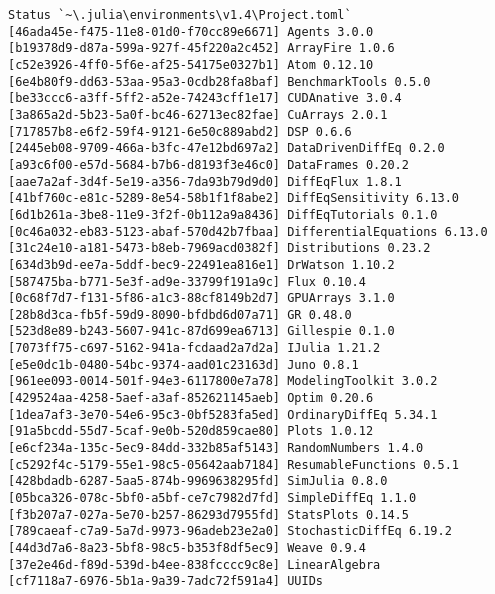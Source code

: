 \documentclass[12pt,a4paper]{article}
\begin{document}
\begin{verbatim}
Status `~\.julia\environments\v1.4\Project.toml`
[46ada45e-f475-11e8-01d0-f70cc89e6671] Agents 3.0.0
[b19378d9-d87a-599a-927f-45f220a2c452] ArrayFire 1.0.6
[c52e3926-4ff0-5f6e-af25-54175e0327b1] Atom 0.12.10
[6e4b80f9-dd63-53aa-95a3-0cdb28fa8baf] BenchmarkTools 0.5.0
[be33ccc6-a3ff-5ff2-a52e-74243cff1e17] CUDAnative 3.0.4
[3a865a2d-5b23-5a0f-bc46-62713ec82fae] CuArrays 2.0.1
[717857b8-e6f2-59f4-9121-6e50c889abd2] DSP 0.6.6
[2445eb08-9709-466a-b3fc-47e12bd697a2] DataDrivenDiffEq 0.2.0
[a93c6f00-e57d-5684-b7b6-d8193f3e46c0] DataFrames 0.20.2
[aae7a2af-3d4f-5e19-a356-7da93b79d9d0] DiffEqFlux 1.8.1
[41bf760c-e81c-5289-8e54-58b1f1f8abe2] DiffEqSensitivity 6.13.0
[6d1b261a-3be8-11e9-3f2f-0b112a9a8436] DiffEqTutorials 0.1.0
[0c46a032-eb83-5123-abaf-570d42b7fbaa] DifferentialEquations 6.13.0
[31c24e10-a181-5473-b8eb-7969acd0382f] Distributions 0.23.2
[634d3b9d-ee7a-5ddf-bec9-22491ea816e1] DrWatson 1.10.2
[587475ba-b771-5e3f-ad9e-33799f191a9c] Flux 0.10.4
[0c68f7d7-f131-5f86-a1c3-88cf8149b2d7] GPUArrays 3.1.0
[28b8d3ca-fb5f-59d9-8090-bfdbd6d07a71] GR 0.48.0
[523d8e89-b243-5607-941c-87d699ea6713] Gillespie 0.1.0
[7073ff75-c697-5162-941a-fcdaad2a7d2a] IJulia 1.21.2
[e5e0dc1b-0480-54bc-9374-aad01c23163d] Juno 0.8.1
[961ee093-0014-501f-94e3-6117800e7a78] ModelingToolkit 3.0.2
[429524aa-4258-5aef-a3af-852621145aeb] Optim 0.20.6
[1dea7af3-3e70-54e6-95c3-0bf5283fa5ed] OrdinaryDiffEq 5.34.1
[91a5bcdd-55d7-5caf-9e0b-520d859cae80] Plots 1.0.12
[e6cf234a-135c-5ec9-84dd-332b85af5143] RandomNumbers 1.4.0
[c5292f4c-5179-55e1-98c5-05642aab7184] ResumableFunctions 0.5.1
[428bdadb-6287-5aa5-874b-9969638295fd] SimJulia 0.8.0
[05bca326-078c-5bf0-a5bf-ce7c7982d7fd] SimpleDiffEq 1.1.0
[f3b207a7-027a-5e70-b257-86293d7955fd] StatsPlots 0.14.5
[789caeaf-c7a9-5a7d-9973-96adeb23e2a0] StochasticDiffEq 6.19.2
[44d3d7a6-8a23-5bf8-98c5-b353f8df5ec9] Weave 0.9.4
[37e2e46d-f89d-539d-b4ee-838fcccc9c8e] LinearAlgebra
[cf7118a7-6976-5b1a-9a39-7adc72f591a4] UUIDs
\end{verbatim}
\end{document}
